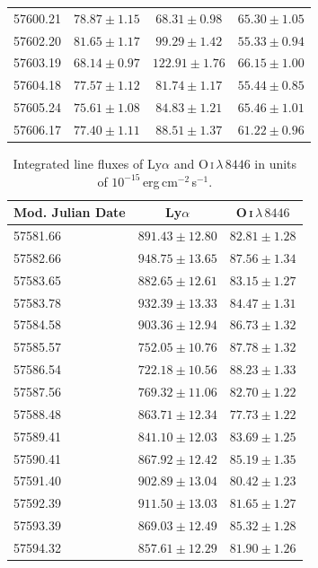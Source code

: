 \begin{table}[h]
\begin{tabular}{lccc}
		57600.21 & $78.87 \pm 1.15$ & $68.31 \pm 0.98$ & $65.30 \pm 1.05$ \\
		57602.20 & $81.65 \pm 1.17$ & $99.29 \pm 1.42$ & $55.33 \pm 0.94$ \\
		57603.19 & $68.14 \pm 0.97$ & $122.91 \pm 1.76$ & $66.15 \pm 1.00$ \\
		57604.18 & $77.57 \pm 1.12$ & $81.74 \pm 1.17$ & $55.44 \pm 0.85$ \\
		57605.24 & $75.61 \pm 1.08$ & $84.83 \pm 1.21$ & $65.46 \pm 1.01$ \\
		57606.17 & $77.40 \pm 1.11$ & $88.51 \pm 1.37$ & $61.22 \pm 0.96$ \\
		\hline
	\end{tabular}
	\label{tab:helium}
\end{table}
\newpage
\begin{table}[h]
	\centering
	\caption[Integrated line fluxes of Ly$\alpha$ and O\,\textsc{i}\,$\lambda\,8446$]{Integrated line fluxes of Ly$\alpha$ and O\,\textsc{i}\,$\lambda\,8446$ in units of $10^{-15}$\,erg\,cm$^{-2}$\,s$^{-1}$.}
	\begin{tabular}{lcc}
		\hline\hline
		Mod. Julian Date & Ly$\alpha$ & O\,\textsc{i}\,$\lambda\,8446$ \\
		\hline
		57581.66 & $891.43 \pm 12.80$ & $82.81 \pm 1.28$ \\
		57582.66 & $948.75 \pm 13.65$ & $87.56 \pm 1.34$ \\
		57583.65 & $882.65 \pm 12.61$ & $83.15 \pm 1.27$ \\
		57583.78 & $932.39 \pm 13.33$ & $84.47 \pm 1.31$ \\
		57584.58 & $903.36 \pm 12.94$ & $86.73 \pm 1.32$ \\
		57585.57 & $752.05 \pm 10.76$ & $87.78 \pm 1.32$ \\
		57586.54 & $722.18 \pm 10.56$ & $88.23 \pm 1.33$ \\
		57587.56 & $769.32 \pm 11.06$ & $82.70 \pm 1.22$ \\
		57588.48 & $863.71 \pm 12.34$ & $77.73 \pm 1.22$ \\
		57589.41 & $841.10 \pm 12.03$ & $83.69 \pm 1.25$ \\
		57590.41 & $867.92 \pm 12.42$ & $85.19 \pm 1.35$ \\
		57591.40 & $902.89 \pm 13.04$ & $80.42 \pm 1.23$ \\
		57592.39 & $911.50 \pm 13.03$ & $81.65 \pm 1.27$ \\
		57593.39 & $869.03 \pm 12.49$ & $85.32 \pm 1.28$ \\
		57594.32 & $857.61 \pm 12.29$ & $81.90 \pm 1.26$ \\

\end{tabular}
\end{table}
